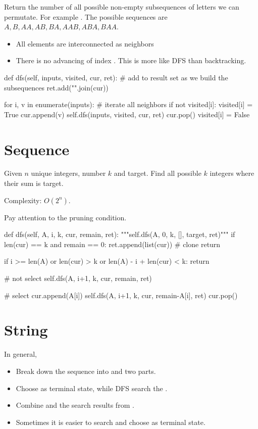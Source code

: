  Return the number of all possible non-empty subsequences of letters we can permutate. For example . The possible sequences are $A, B, AA, AB, BA, AAB, ABA, BAA$.

\begin{itemize}
\item All elements are interconnected as neighbors
\item There is no advancing of index . This is more like DFS than backtracking.
\end{itemize}
\begin{python}
def dfs(self, inputs, visited, cur, ret):
    # add to result set as we build the subsequences
    ret.add("".join(cur))

    for i, v in enumerate(inputs):
        # iterate all neighbors
        if not visited[i]:
            visited[i] = True
            cur.append(v)
            self.dfs(inputs, visited, cur, ret)
            cur.pop()
            visited[i] = False
\end{python}

\section{Sequence}
 Given $n$ unique integers, number $k$ and target. Find all possible $k$ integers where their sum is target. 

Complexity: $O(2^n)$.

Pay attention to the pruning condition.

\begin{python}
def dfs(self, A, i, k, cur, remain, ret):
    """self.dfs(A, 0, k, [], target, ret)"""
    if len(cur) == k and remain == 0:
        ret.append(list(cur))  # clone 
        return

    if i >= len(A) or len(cur) > k 
       or len(A) - i + len(cur) < k:
        return
	
	# not select 
    self.dfs(A, i+1, k, cur, remain, ret)
    
    # select
    cur.append(A[i])
    self.dfs(A, i+1, k, cur, remain-A[i], ret)
    cur.pop()
\end{python}


\section{String}
In general, 
\begin{itemize}
\item Break down the sequence into  and  two parts. 
\item Choose  as terminal state, while DFS search the . 
\item Combine  and the search results from .
\item Sometimes it is easier to search  and choose  as terminal state. 
\end{itemize}
